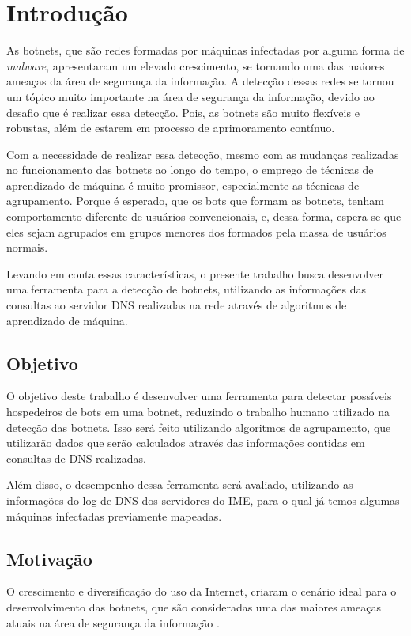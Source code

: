 \chapter{Introdução}
As botnets, que são redes formadas por máquinas infectadas por alguma forma de \textit{malware}, apresentaram um elevado crescimento, se tornando uma das maiores ameaças da área de segurança da informação. A detecção dessas redes se tornou um tópico muito importante na área de segurança da informação, devido ao desafio que é realizar essa detecção. Pois, as botnets são muito flexíveis e robustas, além de estarem em processo de aprimoramento contínuo.

Com a necessidade de realizar essa detecção, mesmo com as mudanças realizadas no funcionamento das botnets ao longo do tempo, o emprego de técnicas de aprendizado de máquina é muito promissor, especialmente as técnicas de agrupamento. Porque é esperado, que os bots que formam as botnets, tenham comportamento diferente de usuários convencionais, e, dessa forma, espera-se que eles sejam agrupados em grupos menores dos formados pela massa de usuários normais.

Levando em conta essas características, o presente trabalho busca desenvolver uma ferramenta para a detecção de botnets, utilizando as informações das consultas ao servidor DNS realizadas na rede através de algoritmos de aprendizado de máquina.

\section{Objetivo}
O objetivo deste trabalho é desenvolver uma ferramenta para detectar possíveis hospedeiros de bots em uma botnet, reduzindo o trabalho humano utilizado na detecção das botnets. Isso será feito utilizando algoritmos de agrupamento, que utilizarão dados que serão calculados através das informações contidas em consultas de DNS realizadas. 

Além disso, o desempenho dessa ferramenta será avaliado, utilizando as informações do log de DNS dos servidores do IME, para o qual já temos algumas máquinas infectadas previamente mapeadas.

\section{Motivação}
O crescimento e diversificação do uso da Internet, criaram o cenário ideal para o desenvolvimento das botnets, que são consideradas uma das maiores ameaças atuais na área de segurança da informação \citep{ji2008botnet}.

